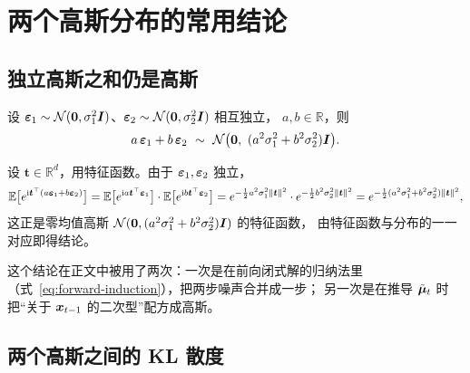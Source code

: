 \section{两个高斯分布的常用结论}

\subsection{独立高斯之和仍是高斯}
\label{app:gauss-sum}

\begin{proposition}
设 $\bm{\varepsilon}_1\sim\mathcal{N}(\bm{0},\sigma_1^2\bm{I})$、$\bm{\varepsilon}_2\sim\mathcal{N}(\bm{0},\sigma_2^2\bm{I})$ 相互独立，
$a,b\in\mathbb{R}$，则
\begin{equation}
  a\,\beps_1+b\,\beps_2\ \sim\ \Ncal\bigl(\bzero,\ (a^2\sigma_1^2+b^2\sigma_2^2)\bI\bigr).
  \label{eq:gauss-sum}
\end{equation}
\end{proposition}

\begin{pf}
设 $\bm{t}\in\mathbb{R}^d$，用特征函数。由于 $\bm{\varepsilon}_1,\bm{\varepsilon}_2$ 独立，
\begin{equation}
  \mathbb{E}\bigl[e^{\mathrm{i}\bm{t}^{\top}(a\bm{\varepsilon}_1+b\bm{\varepsilon}_2)}\bigr]
  =\mathbb{E}\bigl[e^{\mathrm{i}a\bm{t}^{\top}\bm{\varepsilon}_1}\bigr]\cdot\mathbb{E}\bigl[e^{\mathrm{i}b\bm{t}^{\top}\bm{\varepsilon}_2}\bigr]
  =e^{-\frac{1}{2}a^2\sigma_1^2\|\bm{t}\|^2}\cdot e^{-\frac{1}{2}b^2\sigma_2^2\|\bm{t}\|^2}
  =e^{-\frac{1}{2}(a^2\sigma_1^2+b^2\sigma_2^2)\|\bm{t}\|^2},
\end{equation}
这正是零均值高斯 $\mathcal{N}(\bm{0},(a^2\sigma_1^2+b^2\sigma_2^2)\bm{I})$ 的特征函数，
由特征函数与分布的一一对应即得结论。
\end{pf}

这个结论在正文中被用了两次：一次是在前向闭式解的归纳法里
（式~\eqref{eq:forward-induction}），把两步噪声合并成一步；
另一次是在推导 $\tilde{\bm{\mu}}_t$ 时把“关于 $\bm{x}_{t-1}$ 的二次型”配方成高斯。

\subsection{两个高斯之间的 KL 散度}
\label{app:kl-gauss}

